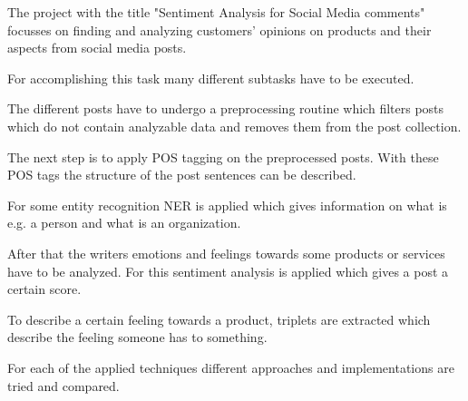 The project with the title "Sentiment Analysis for Social Media comments" focusses on finding and analyzing customers' opinions on products and their aspects from social media posts.

For accomplishing this task many different subtasks have to be executed.

The different posts have to undergo a preprocessing routine which filters posts which do not contain analyzable data and removes them from the post collection.

The next step is to apply POS tagging on the preprocessed posts. 
With these POS tags the structure of the post sentences can be described.

For some entity recognition NER is applied which gives information on what is e.g. a person and what is an organization.

After that the writers emotions and feelings towards some products or services have to be analyzed. 
For this sentiment analysis is applied which gives a post a certain score.

To describe a certain feeling towards a product, triplets are extracted which describe the feeling someone has to something.

For each of the applied techniques different approaches and implementations are tried and compared.